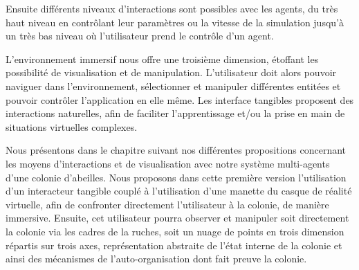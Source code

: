 		Ensuite différents niveaux d'interactions sont possibles avec les agents, du très haut niveau en contrôlant leur paramètres ou la vitesse de la simulation jusqu'à un très bas niveau où l'utilisateur prend le contrôle d'un agent.
		
		L'environnement immersif nous offre une troisième dimension, étoffant les possibilité de visualisation et de manipulation. L'utilisateur doit alors pouvoir naviguer dans l'environnement, sélectionner et manipuler différentes entitées et pouvoir contrôler l'application en elle même. Les interface tangibles proposent des interactions naturelles, afin de faciliter l'apprentissage et/ou la prise en main de situations virtuelles complexes.
		
		Nous présentons dans le chapitre suivant nos différentes propositions concernant les moyens d'interactions et de visualisation avec notre système multi-agents d'une colonie d'abeilles. Nous proposons dans cette première version l'utilisation d'un interacteur tangible couplé à l'utilisation d'une manette du casque de réalité virtuelle, afin de confronter directement l'utilisateur à la colonie, de manière immersive. Ensuite, cet utilisateur pourra observer et manipuler soit directement la colonie via les cadres de la ruches, soit un nuage de points en trois dimension répartis sur trois axes, représentation abstraite de l'état interne de la colonie et ainsi des mécanismes de l'auto-organisation dont fait preuve la colonie.